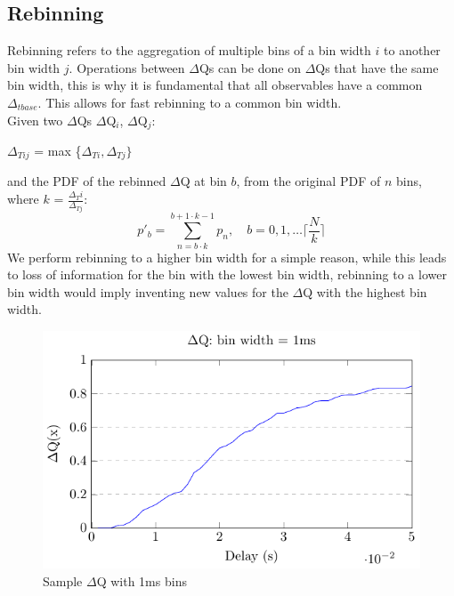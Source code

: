     \subsection{Rebinning}
        Rebinning refers to the aggregation of multiple bins of a bin width $i$ to another bin width $j$. 
        Operations between $\Delta$Qs can be done on $\Delta$Qs that have the same bin width, this is why it is fundamental that all observables have a common $\Delta_{tbase}$. This allows for fast rebinning to a common bin width. \\
        Given two $\Delta$Qs $\Delta$Q$_i$, $\Delta$Q$_j$:
        \begin{center}
            $\Delta_{Tij}$ = max \{$\Delta_{Ti}, \Delta_{Tj} \}$
        \end{center}
        and the PDF of the rebinned $\Delta$Q at bin $b$, from the original PDF of $n$ bins, where $k$ = $\frac{\Delta{_Ti}}{\Delta_{Tj}}$:
        \begin{equation}
            p'_b = \sum_{n=b \cdot k}^{b+ 1 \cdot k - 1} p_n, \quad b=0,1,\dots \lceil \frac{N}{k} \rceil  
        \end{equation}
        We perform rebinning to a higher bin width for a simple reason, while this leads to loss of information for the bin with the lowest bin width, rebinning to a lower bin width would imply inventing new values for the $\Delta$Q with the highest bin width.
       
        \begin{figure}[H]
            \begin{center}
                \includegraphics[scale=1.2]{tikz/cdf.pdf}
            \end{center}
            \caption{Sample $\Delta$Q with 1ms bins}
        \end{figure}%
 
